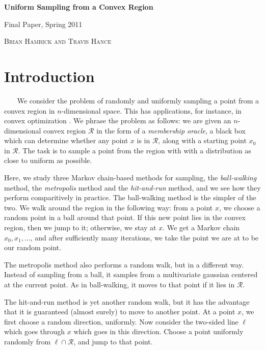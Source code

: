 \documentclass[11pt]{article}
\begin{document}
\begin{center} \begin{LARGE} {\sc \bf Uniform Sampling from a Convex Region} \vspace{6pt}

{ Final Paper, Spring 2011} \vspace{9pt}

\end{LARGE} { \Large \textsc{Brian Hamrick and Travis Hance}}

\end{center}

\section{Introduction}

~~~ We consider the problem of randomly and uniformly sampling a point from a convex region in $n$-dimensional space. This has applications, for instance, in convex optimization \cite{Dabbene}. We phrase the problem as follows: we are given an $n$-dimensional convex region $\mathcal{R}$ in the form of a \emph{membership oracle}, a black box which can determine whether any point $x$ is in $\mathcal{R}$, along with a starting point $x_0$ in $\mathcal{R}$. The task is to sample a point from the region with with a distribution as close to uniform as possible.

Here, we study three Markov chain-based methods for sampling, the \emph{ball-walking} method, the \emph{metropolis} method and the \emph{hit-and-run} \cite{Vempala} method, and we see how they perform comparitively in practice. The ball-walking method is the simpler of the two. We walk around the region in the following way: from a point $x$, we choose a random point in a ball around that point. If this new point lies in the convex region, then we jump to it; otherwise, we stay at $x$. We get a Markov chain $x_0, x_1, ...$, and after sufficiently many iterations, we take the point we are at to be our random point.

The metropolis method also performs a random walk, but in a different way. Instead of sampling from a ball, it samples from a multivariate gaussian centered at the current point. As in ball-walking, it moves to that point if it lies in $\mathcal{R}$.

The hit-and-run method is yet another random walk, but it has the advantage that it is guaranteed (almost surely) to move to another point. At a point $x$, we first choose a random direction, uniformly. Now consider the two-sided line $\ell$ which goes through $x$ which goes in this direction. Choose a point uniformly randomly from $\ell\cap\mathcal{R}$, and jump to that point.
\end{document}
